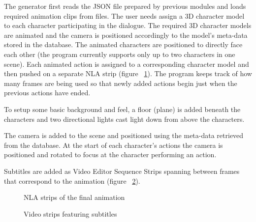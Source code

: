 The generator first reads the JSON file prepared by previous modules and loads required animation clips from files. The user needs assign a 3D character model to each character participating in the dialogue. The required 3D character models are animated and the camera is positioned accordingly to the model's meta-data stored in the database. The animated characters are positioned to directly face each other (the program currently supports only up to two characters in one scene). Each animated action is assigned to a corresponding character model and then pushed on a separate NLA strip (figure ~\ref{fig:nla}). The program keeps track of how many frames are being used so that newly added actions begin just when the previous actions have ended.

To setup some basic background and feel, a floor (plane) is added beneath the characters and two directional lights cast light down from above the characters.

The camera is added to the scene and positioned using the meta-data retrieved from the database. At the start of each character's actions the camera is positioned and rotated to focus at the character performing an action.

Subtitles are added as Video Editor Sequence Strips spanning between frames that correspond to the animation (figure ~\ref{fig:substrips}).

\begin{figure}[H]
\centerline{}
\caption{NLA strips of the final animation}\label{fig:nla}
\end{figure}
\begin{figure}[H]
\centerline{}
\caption{Video strips featuring subtitles}\label{fig:substrips}
\end{figure}

